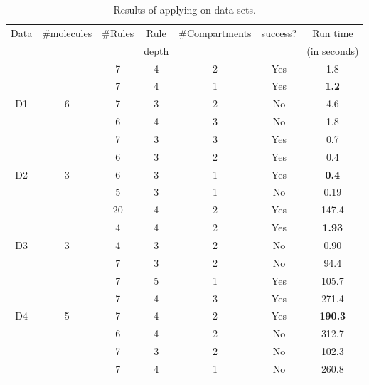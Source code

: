 \begin{table}[t]
  \centering
  \begin{tabular}[t]{|c|c|c|c|c|c|c|}\hline
    Data & \#molecules & \#Rules & Rule  & \#Compartments & success? & Run time \\
         &             &         & depth &               &          & (in seconds) \\\hline
         &   & 7  & 4 & 2 & Yes & 1.8  \\\cline{3-7}
         &   & 7  & 4 & 1 & Yes & {\bf 1.2}  \\\cline{3-7}
    D1   & 6 & 7  & 3 & 2 & No  & 4.6  \\\cline{3-7}
         &   & 6  & 4 & 3 & No  & 1.8  \\\hline
    
         &   & 7  & 3 & 3 & Yes & 0.7  \\\cline{3-7}
         &   & 6  & 3 & 2 & Yes & 0.4  \\\cline{3-7}
    D2   & 3 & 6  & 3 & 1 & Yes & {\bf 0.4}  \\\cline{3-7}
         &   & 5  & 3 & 1 & No  & 0.19 \\\hline

         &   & 20 & 4 & 2 & Yes & 147.4 \\\cline{3-7}
         &   & 4  & 4 & 2 & Yes & {\bf 1.93}  \\\cline{3-7}
    D3   & 3 & 4  & 3 & 2 & No  & 0.90  \\\cline{3-7}
         &   & 7  & 3 & 2 & No  & 94.4  \\\hline

         &   & 7 & 5 & 1 & Yes & 105.7 \\\cline{3-7}
         &   & 7 & 4 & 3 & Yes & 271.4 \\\cline{3-7}
    D4   & 5 & 7 & 4 & 2 & Yes & {\bf 190.3} \\\cline{3-7}
         &   & 6 & 4 & 2 & No  & 312.7 \\\cline{3-7}
         &   & 7 & 3 & 2 & No  & 102.3 \\\cline{3-7}
         &   & 7 & 4 & 1 & No  & 260.8 \\\hline

  \end{tabular}
  \caption{Results of applying \ourtool on data sets.
  }
  \label{tab:results}
  \vspace{-9mm}
\end{table}

